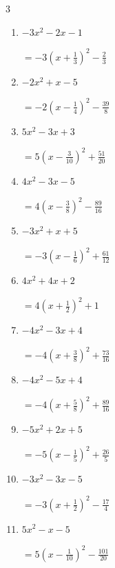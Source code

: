 \begin{multicols}{3}
\begin{enumerate}
        $\displaystyle =3\left( x-\frac{2}{3}\right)^{2}-\frac{19}{3}$

  \item $-3x^{2}-2x-1$

        $\displaystyle =-3\left( x+\frac{1}{3}\right)^{2}-\frac{2}{3}$

\columnbreak %

\resetques

  \item $-2x^{2}+x-5$

        $\displaystyle =-2\left( x-\frac{1}{4}\right)^{2}-\frac{39}{8}$

  \item $5x^{2}-3x+3$

        $\displaystyle =5\left( x-\frac{3}{10}\right)^{2}+\frac{51}{20}$

  \item $4x^{2}-3x-5$

        $\displaystyle =4\left( x-\frac{3}{8}\right)^{2}-\frac{89}{16}$

  \item $-3x^{2}+x+5$

        $\displaystyle =-3\left( x-\frac{1}{6}\right)^{2}+\frac{61}{12}$

  \item $4x^{2}+4x+2$

        $\displaystyle =4\left( x+\frac{1}{2}\right)^{2}+1$

\columnbreak %

  \item $-4x^{2}-3x+4$

        $\displaystyle =-4\left( x+\frac{3}{8}\right)^{2}+\frac{73}{16}$

  \item $-4x^{2}-5x+4$

        $\displaystyle =-4\left( x+\frac{5}{8}\right)^{2}+\frac{89}{16}$

  \item $-5x^{2}+2x+5$

        $\displaystyle =-5\left( x-\frac{1}{5}\right)^{2}+\frac{26}{5}$

  \item $-3x^{2}-3x-5$

        $\displaystyle =-3\left( x+\frac{1}{2}\right)^{2}-\frac{17}{4}$

  \item $5x^{2}-x-5$

        $\displaystyle =5\left( x-\frac{1}{10}\right)^{2}-\frac{101}{20}$


\end{enumerate}
\end{multicols}
